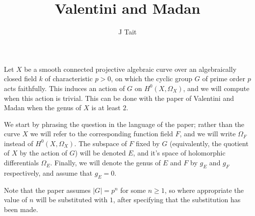 \documentclass[11pt]{article} %
\title{Valentini and Madan}
\author{J Tait}
\theoremstyle{remark}\newtheorem*{rem}{Remark}
\begin{document}
\maketitle
Let $X$ be a smooth connected projective algebraic curve over an algebraically closed field $k$ of characteristic $p>0$, on which the cyclic group $G$ of prime order $p$ acts faithfully.
This induces an action of $G$ on $H^0(X,\Omega_X)$, and we will compute when this action is trivial.
This can be done with the paper of Valentini and Madan when the genus of $X$ is at least $2$.

We start by phrasing the question in the language of the paper; rather than the curve $X$ we will refer to the corresponding function field $F$, and we will write $\Omega_F$ instead of $H^0(X,\Omega_X)$.
The subspace of $F$ fixed by $G$ (equivalently, the quotient of $X$ by the action of $G$) will be denoted $E$, and it's space of holomorphic differentials $\Omega_E$.
Finally, we will denote the genus of $E$ and $F$ by $g_E$ and $g_F$ respectively, and assume that $g_E=0$.

Note that the paper assumes $|G|=p^n$ for some $n \geq 1$, so where appropriate the value of $n$ will be substituted with $1$, after specifying that the substitution has been made.
 
\end{document}
